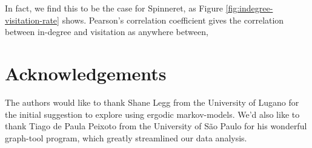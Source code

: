 \documentclass[a4paper,11pt,twocolumn]{article}
\begin{document}
In fact, we find this to be the case for Spinneret, as Figure
\ref{fig:indegree-visitation-rate} shows.  Pearson's correlation coefficient
gives the correlation between in-degree and visitation as anywhere between, 


\section*{Acknowledgements}
The authors would like to thank Shane Legg from the University of Lugano for
the initial suggestion to explore using ergodic markov-models.  We'd also like
to thank Tiago de Paula Peixoto from the University of São Paulo for his
wonderful graph-tool program, which greatly streamlined our data analysis.

%
%
\end{document}
